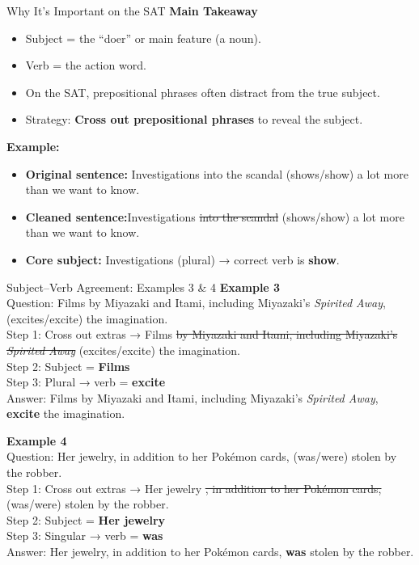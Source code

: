 \documentclass[aspectratio=169,11pt]{beamer}
\begin{document}
\begin{frame}{Why It’s Important on the SAT}
\small
\textbf{Main Takeaway}
\textbf{}
\begin{itemize}
  \item Subject = the “doer” or main feature (a noun).  
  \item Verb = the action word.  
  \item On the SAT, prepositional phrases often distract from the true subject.  
  \item Strategy: \textbf{Cross out prepositional phrases} to reveal the subject.
\end{itemize}

\vspace{0.8em}
\textbf{Example:}
\begin{itemize}
    \item \textbf{Original sentence:} Investigations into the scandal (shows/show) a lot more than we want to know.
    \item \textbf{Cleaned sentence:}Investigations \sout{into the scandal} (shows/show) a lot more than we want to know.  
    \item \textbf{Core subject:} Investigations (plural) → correct verb is \textbf{show}.
\end{itemize}

\end{frame}

\begin{frame}{Subject–Verb Agreement: Examples 3 \& 4}
\small
\textbf{Example 3} \\
Question: Films by Miyazaki and Itami, including Miyazaki's \textit{Spirited Away}, (excites/excite) the imagination. \\
Step 1: Cross out extras → Films \sout{by Miyazaki and Itami, including Miyazaki's \textit{Spirited Away}} (excites/excite) the imagination. \\
Step 2: Subject = \textbf{Films} \\
Step 3: Plural → verb = \textbf{excite} \\
Answer: Films by Miyazaki and Itami, including Miyazaki's \textit{Spirited Away}, \textbf{excite} the imagination.  

\vspace{0.8em}
\textbf{Example 4} \\
Question: Her jewelry, in addition to her Pokémon cards, (was/were) stolen by the robber. \\
Step 1: Cross out extras → Her jewelry \sout{, in addition to her Pokémon cards,} (was/were) stolen by the robber. \\
Step 2: Subject = \textbf{Her jewelry} \\
Step 3: Singular → verb = \textbf{was} \\
Answer: Her jewelry, in addition to her Pokémon cards, \textbf{was} stolen by the robber.
\end{frame}
\end{document}
